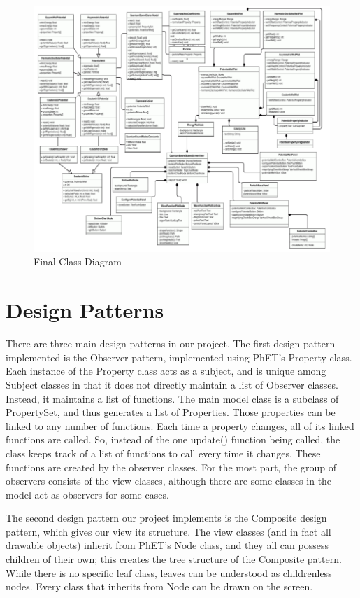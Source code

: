 \begin{figure}[H]
    \centering
    \includegraphics[width=\textwidth]{./img/finalclassdiagram.png}
    \caption{Final Class Diagram}
\end{figure}

\section{Design Patterns}

There are three main design patterns in our project. The first design pattern implemented is the
Observer pattern, implemented using PhET's {\ttfamily Property} class.  Each instance of the
{\ttfamily Property} class acts as a subject, and is unique among Subject classes in that it does
not directly maintain a list of Observer classes.  Instead, it maintains a list of functions.  The
main model class is a subclass of {\ttfamily PropertySet}, and thus generates a list of {\ttfamily
Properties}.  Those properties can be linked to any number of functions. Each time a property
changes, all of its linked functions are called.  So, instead of the one {\ttfamily update()}
function being called, the class keeps track of a list of functions to call every time it changes.
These functions are created by the observer classes. For the most part, the group of observers
consists of the view classes, although there are some classes in the model act as observers for some
cases.

The second design pattern our project implements is the Composite design pattern, which gives our
view its structure. The view classes (and in fact all drawable objects) inherit from PhET's
{\ttfamily Node} class, and they all can possess children of their own; this creates the tree
structure of the Composite pattern. While there is no specific leaf class, leaves can be understood
as childrenless nodes. Every class that inherits from {\ttfamily Node} can be drawn on the screen.

